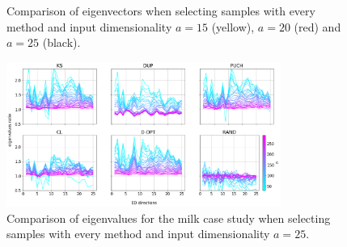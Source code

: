 \documentclass[journal=ancham,manuscript=article]{achemso}
\begin{document}
\begin{figure}[t]
    \centering
    \caption{Comparison of eigenvectors when selecting samples with every method and input dimensionality $a=15$ (yellow), $a=20$ (red) and $a=25$ (black).}
    \label{fig_specific_framework_detereigevect}
\end{figure}

\begin{figure}[b]
\includegraphics[width=0.8\textwidth]{manuscript/figures/d01_milk_specific_framework_eigenvalsratio.png}
\centering
\caption{Comparison of eigenvalues for the milk case study when selecting samples with every method and input dimensionality $a=25$.}
\label{fig_d01_milk_specific_framework_eigenvalsratio}
\end{figure}
\end{document}
